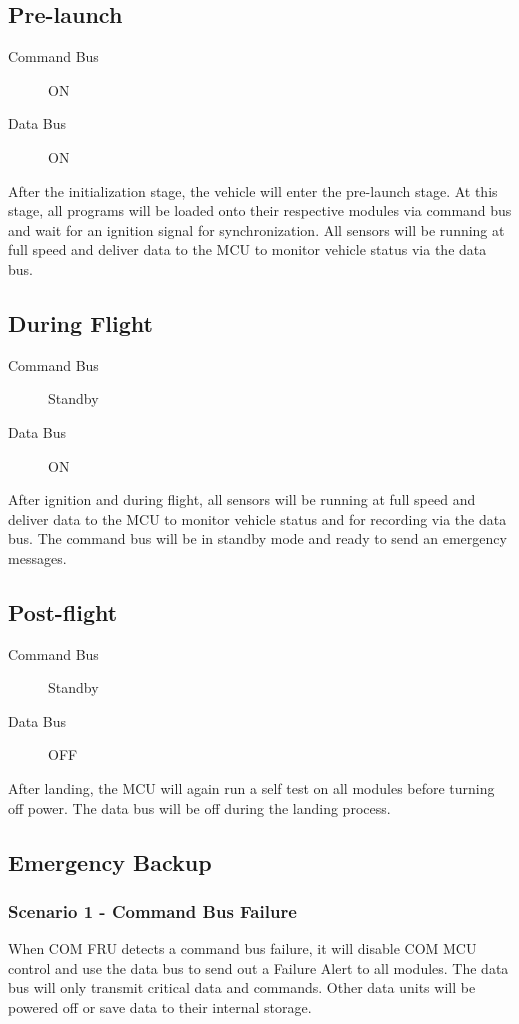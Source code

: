\documentclass[12pt,article]{memoir}
\begin{document}
\subsection{Pre-launch}
\begin{description}
	\item[Command Bus] ON
	\item[Data Bus] ON
\end{description}
After the initialization stage, the vehicle will enter the pre-launch stage. At this stage, all programs will be loaded onto their respective modules via command bus and wait for an ignition signal for synchronization. All sensors will be running at full speed and deliver data to the MCU to monitor vehicle status via the data bus.

\subsection{During Flight}
\begin{description}
	\item[Command Bus] Standby
	\item[Data Bus] ON
\end{description}
After ignition and during flight, all sensors will be running at full speed and deliver data to the MCU to monitor vehicle status and for recording via the data bus. The command bus will be in standby mode and ready to send an emergency messages.

\subsection{Post-flight}
\begin{description}
	\item[Command Bus] Standby
	\item[Data Bus] OFF
\end{description}
After landing, the MCU will again run a self test on all modules before turning off power. The data bus will be off during the landing process.

\subsection{Emergency Backup}
\subsubsection{Scenario 1 - Command Bus Failure}
When COM FRU detects a command bus failure, it will disable COM MCU control and use the data bus to send out a Failure Alert to all modules. The data bus will only transmit critical data and commands. Other data units will be powered off or save data to their internal storage.
\end{document}

